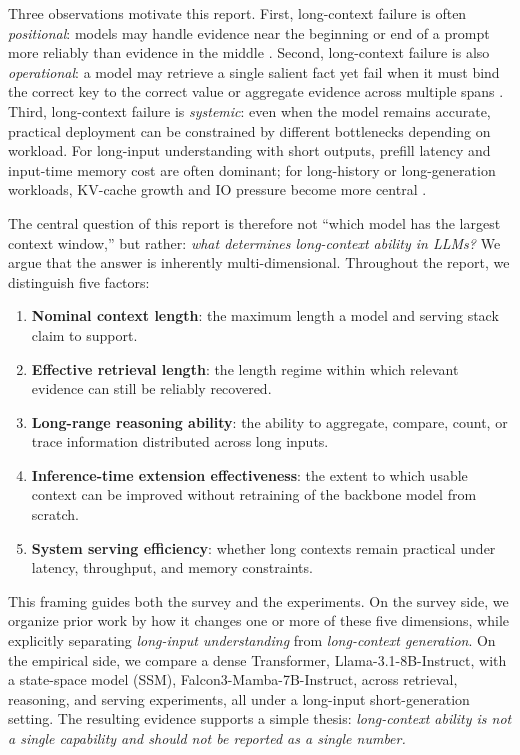 \documentclass[11pt]{article}
\begin{document}
Three observations motivate this report. First, long-context failure is often \emph{positional}: models may handle evidence near the beginning or end of a prompt more reliably than evidence in the middle \citep{liu2024lost}. Second, long-context failure is also \emph{operational}: a model may retrieve a single salient fact yet fail when it must bind the correct key to the correct value or aggregate evidence across multiple spans \citep{hsieh2024ruler, kuratov2024babilong}. Third, long-context failure is \emph{systemic}: even when the model remains accurate, practical deployment can be constrained by different bottlenecks depending on workload. For long-input understanding with short outputs, prefill latency and input-time memory cost are often dominant; for long-history or long-generation workloads, KV-cache growth and IO pressure become more central \citep{dao2022flashattention, kwon2023pagedattention, zheng2024sglang}.

The central question of this report is therefore not ``which model has the largest context window,'' but rather: \emph{what determines long-context ability in LLMs?} We argue that the answer is inherently multi-dimensional. Throughout the report, we distinguish five factors:
\begin{enumerate}[leftmargin=1.5em]
  \item \textbf{Nominal context length}: the maximum length a model and serving stack claim to support.
  \item \textbf{Effective retrieval length}: the length regime within which relevant evidence can still be reliably recovered.
  \item \textbf{Long-range reasoning ability}: the ability to aggregate, compare, count, or trace information distributed across long inputs.
  \item \textbf{Inference-time extension effectiveness}: the extent to which usable context can be improved without retraining of the backbone model from scratch.
  \item \textbf{System serving efficiency}: whether long contexts remain practical under latency, throughput, and memory constraints.
\end{enumerate}

This framing guides both the survey and the experiments. On the survey side, we organize prior work by how it changes one or more of these five dimensions, while explicitly separating \emph{long-input understanding} from \emph{long-context generation}. On the empirical side, we compare a dense Transformer, Llama-3.1-8B-Instruct, with a state-space model (SSM), Falcon3-Mamba-7B-Instruct, across retrieval, reasoning, and serving experiments, all under a long-input short-generation setting. The resulting evidence supports a simple thesis: \emph{long-context ability is not a single capability and should not be reported as a single number.}
\end{document}
